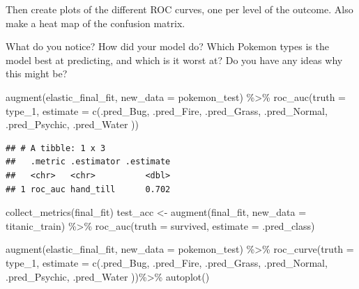 \documentclass[
]{article}
\newenvironment{Shaded}{\begin{snugshade}}{\end{snugshade}}
\newcommand{\AttributeTok}[1]{\textcolor[rgb]{0.77,0.63,0.00}{#1}}
\newcommand{\FunctionTok}[1]{\textcolor[rgb]{0.00,0.00,0.00}{#1}}
\newcommand{\NormalTok}[1]{#1}
\newcommand{\SpecialCharTok}[1]{\textcolor[rgb]{0.00,0.00,0.00}{#1}}
\begin{document}
Then create plots of the different ROC curves, one per level of the
outcome. Also make a heat map of the confusion matrix.

What do you notice? How did your model do? Which Pokemon types is the
model best at predicting, and which is it worst at? Do you have any
ideas why this might be?

\begin{Shaded}
\begin{Highlighting}[]
\FunctionTok{augment}\NormalTok{(elastic\_final\_fit, }\AttributeTok{new\_data =}\NormalTok{ pokemon\_test) }\SpecialCharTok{\%\textgreater{}\%}
  \FunctionTok{roc\_auc}\NormalTok{(}\AttributeTok{truth =}\NormalTok{ type\_1, }\AttributeTok{estimate =} \FunctionTok{c}\NormalTok{(.pred\_Bug, .pred\_Fire, }
\NormalTok{                                       .pred\_Grass, .pred\_Normal, }
\NormalTok{                                       .pred\_Psychic, .pred\_Water}
\NormalTok{                                       ))}
\end{Highlighting}
\end{Shaded}

\begin{verbatim}
## # A tibble: 1 x 3
##   .metric .estimator .estimate
##   <chr>   <chr>          <dbl>
## 1 roc_auc hand_till      0.702
\end{verbatim}

collect\_metrics(final\_fit) test\_acc \textless- augment(final\_fit,
new\_data = titanic\_train) \%\textgreater\% roc\_auc(truth = survived,
estimate = .pred\_class)

\begin{Shaded}
\begin{Highlighting}[]
\FunctionTok{augment}\NormalTok{(elastic\_final\_fit, }\AttributeTok{new\_data =}\NormalTok{ pokemon\_test) }\SpecialCharTok{\%\textgreater{}\%}
  \FunctionTok{roc\_curve}\NormalTok{(}\AttributeTok{truth =}\NormalTok{ type\_1, }\AttributeTok{estimate =} \FunctionTok{c}\NormalTok{(.pred\_Bug, .pred\_Fire, }
\NormalTok{                                       .pred\_Grass, .pred\_Normal, }
\NormalTok{                                       .pred\_Psychic, .pred\_Water}
\NormalTok{                                       ))}\SpecialCharTok{\%\textgreater{}\%}
              \FunctionTok{autoplot}\NormalTok{()}
\end{Highlighting}
\end{Shaded}
\end{document}
